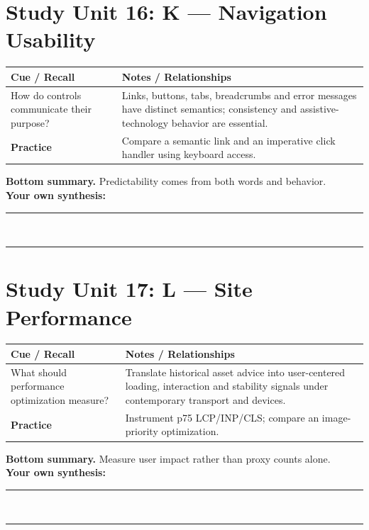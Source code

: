 \documentclass[11pt]{article}
\begin{document}
\section{Study Unit 16: K — Navigation Usability}
\begin{longtable}{@{}p{.27\linewidth}p{.66\linewidth}@{}}\toprule
\textbf{Cue / Recall} & \textbf{Notes / Relationships}\\\midrule\endhead
How do controls communicate their purpose? & Links, buttons, tabs, breadcrumbs and error messages have distinct semantics; consistency and assistive-technology behavior are essential.\\
\addlinespace[4mm]
\textbf{Practice} & Compare a semantic link and an imperative click handler using keyboard access.\\\bottomrule\end{longtable}
\begin{dosnotebox}\textbf{Bottom summary.} Predictability comes from both words and behavior.\\[2mm]
\textbf{Your own synthesis:} \rule{.72\linewidth}{.4pt}\\[4mm]
\rule{.96\linewidth}{.4pt}\end{dosnotebox}

\section{Study Unit 17: L — Site Performance}
\begin{longtable}{@{}p{.27\linewidth}p{.66\linewidth}@{}}\toprule
\textbf{Cue / Recall} & \textbf{Notes / Relationships}\\\midrule\endhead
What should performance optimization measure? & Translate historical asset advice into user-centered loading, interaction and stability signals under contemporary transport and devices.\\
\addlinespace[4mm]
\textbf{Practice} & Instrument p75 LCP/INP/CLS; compare an image-priority optimization.\\\bottomrule\end{longtable}
\begin{dosnotebox}\textbf{Bottom summary.} Measure user impact rather than proxy counts alone.\\[2mm]
\textbf{Your own synthesis:} \rule{.72\linewidth}{.4pt}\\[4mm]
\rule{.96\linewidth}{.4pt}\end{dosnotebox}
\end{document}
